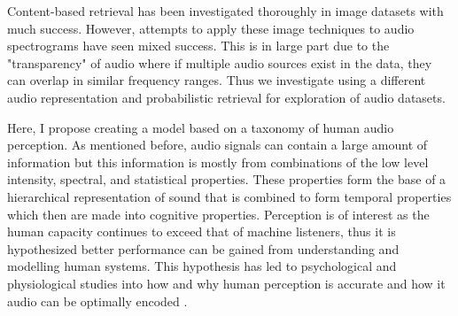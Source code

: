 Content-based retrieval has been investigated thoroughly in image datasets with much success. However, attempts to apply these image techniques to audio spectrograms have seen mixed success. This is in large part due to the "transparency" of audio where if multiple audio sources exist in the data, they can overlap in similar frequency ranges. Thus we investigate using a different audio representation and probabilistic retrieval for exploration of audio datasets.

Here, I propose creating a model based on a taxonomy of human audio perception. As mentioned before, audio signals can contain a large amount of information but this information is mostly from combinations of the low level intensity, spectral, and statistical properties. These properties form the base of a hierarchical representation of sound that is combined to form temporal properties which then are made into cognitive properties. Perception is of interest as the human capacity continues to exceed that of machine listeners, thus it is hypothesized better performance can be gained from understanding and modelling human systems. This hypothesis has led to psychological and physiological studies into how and why human perception is accurate and how it audio can be optimally encoded \cite{Gaver1993, Eggermont2001, slaney1993importance, Piazza2013}.



